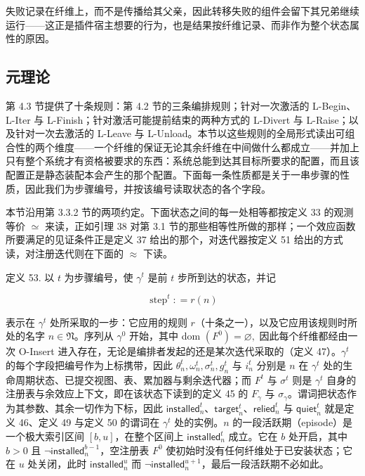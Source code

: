 \documentclass[
  10
]{article}
\begin{document}
失败记录在纤维上，而不是传播给其父亲，因此转移失败的组件会留下其兄弟继续运行——这正是插件宿主想要的行为，也是结果按纤维记录、而非作为整个状态属性的原因。
\subsection{元理论} \label{metatheory}

第 4.3 节提供了十条规则：第 4.2 节的三条编排规则；针对一次激活的 L-Begin、L-Iter 与 L-Finish；针对激活可能提前结束的两种方式的 L-Divert 与 L-Raise；以及针对一次去激活的 L-Leave 与 L-Unload。本节以这些规则的全局形式读出可组合性的两个维度——一个纤维的保证无论其余纤维在中间做什么都成立——并加上只有整个系统才有资格被要求的东西：系统总能到达其目标所要求的配置，而且该配置正是静态装配本会产生的那个配置。下面每一条性质都是关于一串步骤的性质，因此我们为步骤编号，并按该编号读取状态的各个字段。

本节沿用第 3.3.2 节的两项约定。下面状态之间的每一处相等都按定义 33 的观测等价 $\simeq$ 来读，正如引理 38 对第 3.1 节的那些相等性所做的那样；一个效应函数所要满足的见证条件正是定义 37 给出的那个，对迭代器按定义 51 给出的方式读，对注册迭代则在下面的 $\approx$ 下读。

定义 53. 以 $t$ 为步骤编号，使 $\gamma ^ { t }$ 是前 $t$ 步所到达的状态，并记

\[
\operatorname { s t e p } ^ { t } : = r ( n )\tag{50}
\]

表示在 $\gamma ^ { t }$ 处所采取的一步：它应用的规则 $r$（十条之一），以及它应用该规则时所处的名字 $n \in \mathfrak { N }$。序列从 $\gamma ^ { 0 }$ 开始，其中 dom $\left( F ^ { 0 } \right) = \varnothing ,$ 因此每个纤维都经由一次 O-Insert 进入存在，无论是编排者发起的还是某次迭代采取的（定义 47）。$\gamma ^ { t }$ 的每个字段把编号作为上标携带，因此 $\theta _ { n } ^ { t } , \omega _ { n } ^ { t } , \sigma _ { n } ^ { t } , g _ { n } ^ { t }$ 与 $i _ { n } ^ { t }$ 分别是 $n$ 在 $\gamma ^ { t }$ 处的生命周期状态、已提交视图、表、累加器与剩余迭代器；而 $F ^ { t }$ 与 $\sigma ^ { t }$ 则是 $\gamma ^ { t }$ 自身的注册表与余效应上下文，即在该状态下读到的定义 45 的 $F _ { \gamma }$ 与 $\sigma _ { \gamma }$。谓词把状态作为其参数、其余一切作为下标，因此 $\mathsf{installed}_{n}^{t}$、$\mathsf{target}_{n}^{t}$、$\mathsf{relied}_{n}^{t}$ 与 $\mathsf{quiet}_{n}^{t}$ 就是定义 46、定义 49 与定义 50 的谓词在 $\gamma ^ { t }$ 处的实例。$n$ 的一段活跃期（episode）是一个极大索引区间 $[ b , u ]$，在整个区间上 $\mathsf{installed}_{n}^{t}$ 成立。它在 $b$ 处开启，其中 $b > 0$ 且 $\neg \mathsf{installed}_{n}^{b - 1}$，空注册表 $F ^ { 0 }$ 使初始时没有任何纤维处于已安装状态；它在 $u$ 处关闭，此时 $\mathsf{installed}_{n}^{u}$ 而 $\neg \mathsf{installed}_{n}^{u + 1}$，最后一段活跃期不必如此。
\end{document}

